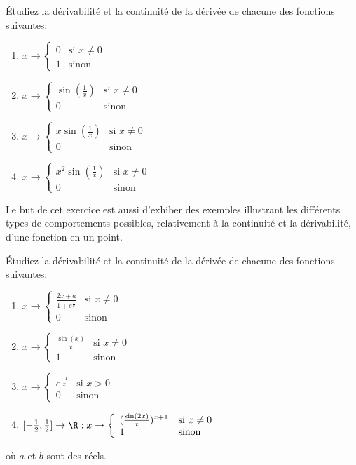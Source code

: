\exerNico Étudiez la dérivabilité et la continuité
de la dérivée de chacune des fonctions suivantes:
\begin{enumerate}
\item $ x \rightarrow
\left\{ \begin{array}{ll}
0 & \mbox{si } x \not= 0 \\
1 & \mbox{sinon}
\end{array} \right.$
%
\item $ x \rightarrow
\left\{ \begin{array}{ll}
\sin(\frac{1}{x}) & \mbox{si } x \not= 0 \\
0 & \mbox{sinon}
\end{array} \right.$
%
\item $ x \rightarrow
\left\{ \begin{array}{ll}
x \sin(\frac{1}{x}) & \mbox{si } x \not= 0 \\
0 & \mbox{sinon}
\end{array} \right.$
%
\item $ x \rightarrow
\left\{ \begin{array}{ll}
x^2 \sin(\frac{1}{x}) & \mbox{si } x \not= 0 \\
0 & \mbox{sinon}
\end{array} \right.$
\end{enumerate}

Le but de cet exercice est aussi d'exhiber des exemples illustrant les
différents types de comportements possibles, relativement à la
continuité et la dérivabilité, d'une fonction en un point.

\exerNico Étudiez la dérivabilité et la continuité
de la dérivée de chacune des fonctions suivantes:
\begin{enumerate}
\item $ x \rightarrow
\left\{ \begin{array}{ll}
\frac{2x+a}{1+e^{\frac{1}{x}}} & \mbox{si } x \not= 0 \\
0 & \mbox{sinon}
\end{array} \right.$
%
\item $ x \rightarrow
\left\{ \begin{array}{ll}
\frac{\sin(x)}{x} & \mbox{si } x \not= 0 \\
1 & \mbox{sinon}
\end{array} \right.$
%
\item $ x \rightarrow
\left\{ \begin{array}{ll}
e^{\frac{-1}{x}} & \mbox{si } x > 0 \\
0 & \mbox{sinon}
\end{array} \right.$
%
\item $ [-\frac{1}{2}, \frac{1}{2}] \rightarrow \R: x \rightarrow
\left\{ \begin{array}{ll}
(\frac{\sin(2x)}{x})^{x+1} & \mbox{si } x \not= 0 \\
1 & \mbox{sinon}
\end{array} \right.$
\end{enumerate}
où $a$ et $b$ sont des réels.


